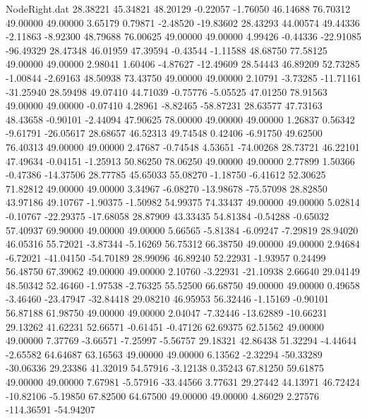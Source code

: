 \begin{filecontents}{NodeRight.dat}
  28.38221   45.34821   48.20129    -0.22057   -1.76050   46.14688   76.70312   49.00000   49.00000    3.65179    0.79871   -2.48520  -19.83602
  28.43293   44.00574   49.44336    -2.11863   -8.92300   48.79688   76.00625   49.00000   49.00000    4.99426   -0.44336  -22.91085  -96.49329
  28.47348   46.01959   47.39594    -0.43544   -1.11588   48.68750   77.58125   49.00000   49.00000    2.98041    1.60406   -4.87627  -12.49609
  28.54443   46.89209   52.73285    -1.00844   -2.69163   48.50938   73.43750   49.00000   49.00000    2.10791   -3.73285  -11.71161  -31.25940
  28.59498   49.07410   44.71039    -0.75776   -5.05525   47.01250   78.91563   49.00000   49.00000   -0.07410    4.28961   -8.82465  -58.87231
  28.63577   47.73163   48.43658    -0.90101   -2.44094   47.90625   78.00000   49.00000   49.00000    1.26837    0.56342   -9.61791  -26.05617
  28.68657   46.52313   49.74548     0.42406   -6.91750   49.62500   76.40313   49.00000   49.00000    2.47687   -0.74548    4.53651  -74.00268
  28.73721   46.22101   47.49634    -0.04151   -1.25913   50.86250   78.06250   49.00000   49.00000    2.77899    1.50366   -0.47386  -14.37506
  28.77785   45.65033   55.08270    -1.18750   -6.41612   52.30625   71.82812   49.00000   49.00000    3.34967   -6.08270  -13.98678  -75.57098
  28.82850   43.97186   49.10767    -1.90375   -1.50982   54.99375   74.33437   49.00000   49.00000    5.02814   -0.10767  -22.29375  -17.68058
  28.87909   43.33435   54.81384    -0.54288   -0.65032   57.40937   69.90000   49.00000   49.00000    5.66565   -5.81384   -6.09247   -7.29819
  28.94020   46.05316   55.72021    -3.87344   -5.16269   56.75312   66.38750   49.00000   49.00000    2.94684   -6.72021  -41.04150  -54.70189
  28.99096   46.89240   52.22931    -1.93957    0.24499   56.48750   67.39062   49.00000   49.00000    2.10760   -3.22931  -21.10938    2.66640
  29.04149   48.50342   52.46460    -1.97538   -2.76325   55.52500   66.68750   49.00000   49.00000    0.49658   -3.46460  -23.47947  -32.84418
  29.08210   46.95953   56.32446    -1.15169   -0.90101   56.87188   61.98750   49.00000   49.00000    2.04047   -7.32446  -13.62889  -10.66231
  29.13262   41.62231   52.66571    -0.61451   -0.47126   62.69375   62.51562   49.00000   49.00000    7.37769   -3.66571   -7.25997   -5.56757
  29.18321   42.86438   51.32294    -4.44644   -2.65582   64.64687   63.16563   49.00000   49.00000    6.13562   -2.32294  -50.33289  -30.06336
  29.23386   41.32019   54.57916    -3.12138    0.35243   67.81250   59.61875   49.00000   49.00000    7.67981   -5.57916  -33.44566    3.77631
  29.27442   44.13971   46.72424   -10.82106   -5.19850   67.82500   64.67500   49.00000   49.00000    4.86029    2.27576 -114.36591  -54.94207

\end{filecontents}
